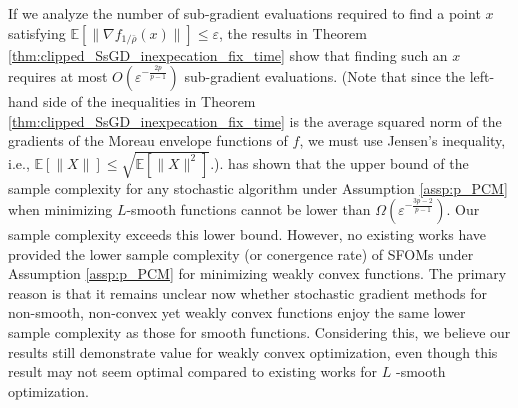 \documentclass{article}
\begin{document}
If we analyze the number of sub-gradient evaluations required to find a point $x$ satisfying $\mathbb{E}[\|\nabla f_{1/\bar{\rho}}(x)\|] \leq \varepsilon$, the results in Theorem \ref{thm:clipped_SsGD_inexpecation_fix_time} show that finding such an $x$ requires at most $O\left(\varepsilon^{-\frac{2p}{p-1}}\right)$ sub-gradient evaluations. (Note that since the left-hand side of the inequalities in Theorem \ref{thm:clipped_SsGD_inexpecation_fix_time} is the average squared norm of the gradients of the Moreau envelope functions of $f$, we must use Jensen's inequality, i.e., $\mathbb{E}[\|X\|] \leq \sqrt{\mathbb{E}[\|X\|^2]}$.). \cite{zhang_2020} has shown that the upper bound of the sample complexity for any stochastic algorithm under Assumption \ref{assp:p_PCM} when minimizing $L$-smooth functions cannot be lower than $\Omega(\varepsilon^{-\frac{3p-2}{p-1}})$. Our sample complexity exceeds this lower bound. However, no existing works have provided the lower sample complexity (or conergence rate) of SFOMs under Assumption \ref{assp:p_PCM} for minimizing weakly convex functions. The primary reason is that it remains unclear now whether stochastic gradient methods for non-smooth, non-convex yet weakly convex functions enjoy the same lower sample complexity as those for smooth functions. Considering this, we believe our results still demonstrate value for weakly convex optimization, even though this result may not seem optimal compared to existing works for 
$L$
-smooth optimization. 
\end{document}
